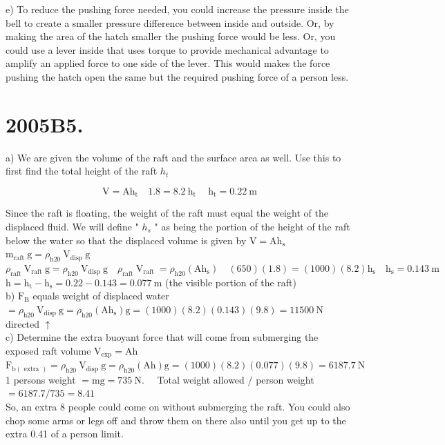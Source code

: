 \begin{enumerate}
e) To reduce the pushing force needed, you could increase the pressure inside the bell to create a smaller pressure difference between inside and outside. Or, by making the area of the hatch smaller the pushing force would be less. Or, you could use a lever inside that uses torque to provide mechanical advantage to amplify an applied force to one side of the lever. This would makes the force pushing the hatch open the same but the required pushing force of a person less.

\section*{2005B5.}
a) We are given the volume of the raft and the surface area as well. Use this to first find the total height of the raft $h_{t}$

$$
\mathrm{V}=\mathrm{Ah}_{\mathrm{t}} \quad 1.8=8.2 \mathrm{~h}_{\mathrm{t}} \quad \mathrm{~h}_{\mathrm{t}}=0.22 \mathrm{~m}
$$

Since the raft is floating, the weight of the raft must equal the weight of the displaced fluid. We will define " $h_{s}$ " as being the portion of the height of the raft below the water so that the displaced volume is given by $\mathrm{V}=\mathrm{Ah}_{\mathrm{s}}$\\
$\mathrm{m}_{\text {raft }} \mathrm{g}=\rho_{\mathrm{h} 20} \mathrm{~V}_{\text {disp }} \mathrm{g}$\\
$\rho_{\text {raft }} \mathrm{V}_{\text {raft }} \mathrm{g}=\rho_{\mathrm{h} 20} \mathrm{~V}_{\text {disp }} \mathrm{g} \quad \rho_{\text {raft }} \mathrm{V}_{\text {raft }}=\rho_{\mathrm{h} 20}\left(\mathrm{Ah}_{\mathrm{s}}\right) \quad(650)(1.8)=(1000)(8.2) \mathrm{h}_{\mathrm{s}} \quad \mathrm{h}_{\mathrm{s}}=0.143 \mathrm{~m}$\\
$\mathrm{h}=\mathrm{h}_{\mathrm{t}}-\mathrm{h}_{\mathrm{s}}=0.22-0.143=0.077 \mathrm{~m}$ (the visible portion of the raft)\\
b) $\mathrm{F}_{\mathrm{B}}$ equals weight of displaced water $=\rho_{\mathrm{h} 20} \mathrm{~V}_{\text {disp }} \mathrm{g}=\rho_{\mathrm{h} 20}\left(\mathrm{Ah}_{\mathrm{s}}\right) \mathrm{g}=(1000)(8.2)(0.143)(9.8)=11500 \mathrm{~N}$ directed $\uparrow$\\
c) Determine the extra buoyant force that will come from submerging the exposed raft volume $\mathrm{V}_{\exp }=\mathrm{Ah}$\\
$\mathrm{F}_{\mathrm{b}(\text { extra })}=\rho_{\mathrm{h} 20} \mathrm{~V}_{\text {disp }} \mathrm{g}=\rho_{\mathrm{h} 20}(\mathrm{Ah}) \mathrm{g}=(1000)(8.2)(0.077)(9.8)=6187.7 \mathrm{~N}$\\
1 persons weight $=\mathrm{mg}=735 \mathrm{~N} . \quad$ Total weight allowed $/$ person weight $=6187.7 / 735=8.41$\\
So, an extra 8 people could come on without submerging the raft. You could also chop some arms or legs off and throw them on there also until you get up to the extra 0.41 of a person limit.


\end{enumerate}
